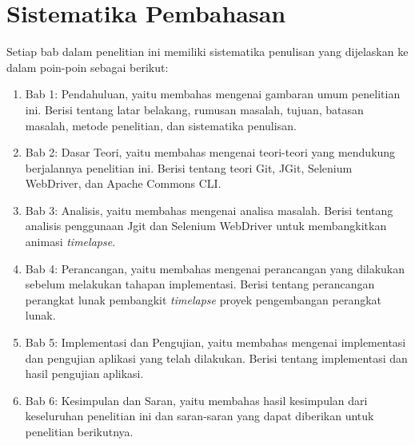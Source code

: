 \section{Sistematika Pembahasan}
\label{sec:sispem}
Setiap bab dalam penelitian ini memiliki sistematika penulisan yang dijelaskan ke dalam poin-poin sebagai berikut:
\begin{enumerate}
		\item Bab 1: Pendahuluan, yaitu membahas mengenai gambaran umum penelitian ini. Berisi tentang latar belakang, rumusan masalah, tujuan, batasan masalah, metode penelitian, dan sistematika penulisan.
		\item Bab 2: Dasar Teori, yaitu membahas mengenai teori-teori yang mendukung berjalannya penelitian ini. Berisi tentang teori Git, JGit, Selenium WebDriver, dan Apache Commons CLI.
		\item Bab 3: Analisis, yaitu membahas mengenai analisa masalah. Berisi tentang analisis penggunaan Jgit dan Selenium WebDriver untuk membangkitkan animasi \textit{timelapse}. 
		\item Bab 4: Perancangan, yaitu membahas mengenai perancangan yang dilakukan sebelum melakukan tahapan implementasi. Berisi tentang perancangan perangkat lunak pembangkit \textit{timelapse} proyek pengembangan perangkat lunak.
		\item Bab 5: Implementasi dan Pengujian, yaitu membahas mengenai implementasi dan pengujian aplikasi yang telah dilakukan. Berisi tentang implementasi dan hasil pengujian aplikasi.
		\item Bab 6: Kesimpulan dan Saran, yaitu membahas hasil kesimpulan dari keseluruhan penelitian ini dan saran-saran yang dapat diberikan untuk penelitian berikutnya.
	\end{enumerate}
